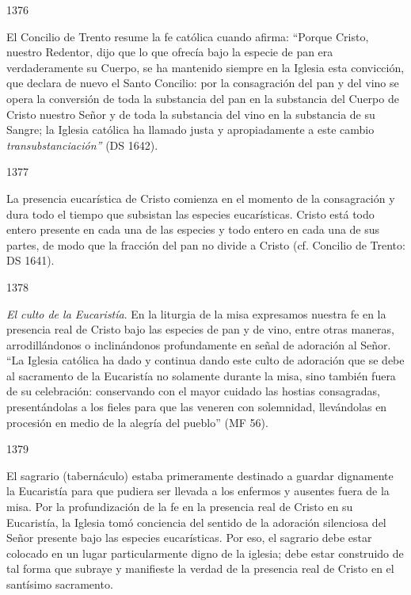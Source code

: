 			\begin{ccebody}\begin{ccenumber}1376\end{ccenumber} El Concilio de Trento resume la fe católica cuando afirma: “Porque Cristo, nuestro Redentor, dijo que lo que ofrecía bajo la especie de pan era verdaderamente su Cuerpo, se ha mantenido siempre en la Iglesia esta convicción, que declara de nuevo el Santo Concilio: por la consagración del pan y del vino se opera la conversión de toda la substancia del pan en la substancia del Cuerpo de Cristo nuestro Señor y de toda la substancia del vino en la substancia de su Sangre; la Iglesia católica ha llamado justa y apropiadamente a este cambio \textit{transubstanciación”} (DS 1642).\end{ccebody}
			
			\begin{ccebody}\begin{ccenumber}1377\end{ccenumber} La presencia eucarística de Cristo comienza en el momento de la consagración y dura todo el tiempo que subsistan las especies eucarísticas. Cristo está todo entero presente en cada una de las especies y todo entero en cada una de sus partes, de modo que la fracción del pan no divide a Cristo (cf. Concilio de Trento: DS 1641).\end{ccebody}
			
			\begin{ccebody}\begin{ccenumber}1378\end{ccenumber} \textit{El culto de la Eucaristía}. En la liturgia de la misa expresamos nuestra fe en la presencia real de Cristo bajo las especies de pan y de vino, entre otras maneras, arrodillándonos o inclinándonos profundamente en señal de adoración al Señor. “La Iglesia católica ha dado y continua dando este culto de adoración que se debe al sacramento de la Eucaristía no solamente durante la misa, sino también fuera de su celebración: conservando con el mayor cuidado las hostias consagradas, presentándolas a los fieles para que las veneren con solemnidad, llevándolas en procesión en medio de la alegría del pueblo” (MF 56).\end{ccebody}
			
			\begin{ccebody}\begin{ccenumber}1379\end{ccenumber} El sagrario (tabernáculo) estaba primeramente destinado a guardar dignamente la Eucaristía para que pudiera ser llevada a los enfermos y ausentes fuera de la misa. Por la profundización de la fe en la presencia real de Cristo en su Eucaristía, la Iglesia tomó conciencia del sentido de la adoración silenciosa del Señor presente bajo las especies eucarísticas. Por eso, el sagrario debe estar colocado en un lugar particularmente digno de la iglesia; debe estar construido de tal forma que subraye y manifieste la verdad de la presencia real de Cristo en el santísimo sacramento.\end{ccebody}
			
